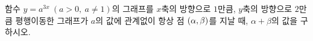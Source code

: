 함수 $y=a^{3x}\ (a>0,\ a\ne 1)$의 그래프를 $x$축의 방향으로 $1$만큼, $y$축의 방향으로 $2$만큼 평행이동한 그래프가 $a$의 값에 관계없이 항상 점 $(\alpha{,}\mkern3mu\mathopen{}\beta)$를 지날 때, $\alpha+\beta$의 값을 구하시오.
